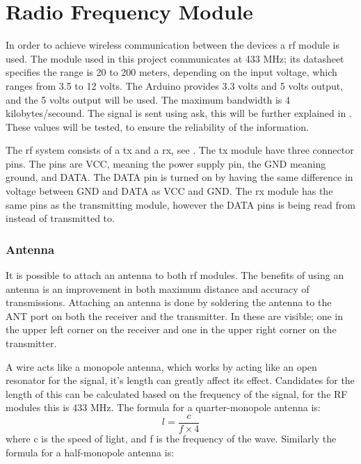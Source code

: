 \section{Radio Frequency Module} \label{rfmodule}
In order to achieve wireless communication between the devices a \gls{rf} module is used.
The module used in this project communicates at 433 MHz; its datasheet specifies the range is 20 to 200 meters, depending on the input voltage, which ranges from 3.5 to 12 volts. 
The Arduino provides 3.3 volts and 5 volts output, and the 5 volts output will be used.
The maximum bandwidth is 4 kilobytes/secound. 
The signal is sent using \gls{ask}, this will be further explained in .
These values will be tested, to ensure the reliability of the information. 

The \gls{rf} system consists of a \gls{tx} and a \gls{rx}, see .
The \gls{tx} module have three connector pins.
The pins are VCC, meaning the power supply pin, the GND meaning ground, and DATA.
The DATA pin is turned on by having the same difference in voltage between GND and DATA as VCC and GND. 
The \gls{rx} module has the same pins as the transmitting module, however the DATA pins is being read from instead of transmitted to.


\subsubsection{Antenna}
It is possible to attach an antenna to both \gls{rf} modules. 
The benefits of using an antenna is an improvement in both maximum distance and accuracy of transmissions.
Attaching an antenna is done by soldering the antenna to the ANT port on both the receiver and the transmitter. 
In  these are visible; one in the upper left corner on the receiver and one in the upper right corner on the transmitter. 

A wire acts like a monopole antenna, which works by acting like an open resonator for the signal, it's length can greatly affect its effect. 
Candidates for the length of this can be calculated based on the frequency of the signal, for the RF modules this is 433 MHz.
The formula for a quarter-monopole antenna is: 
\begin{equation} \label{QMA}
l = \frac{c}{f \times 4}
\end{equation}
where c is the speed of light, and f is the frequency of the wave.
Similarly the formula for a half-monopole antenna is: 

